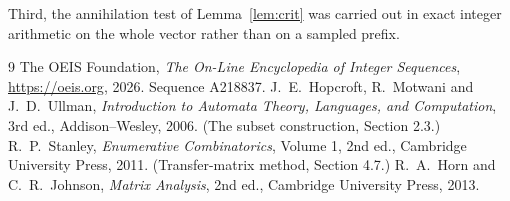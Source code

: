 \documentclass[11pt,a4paper]{article}
\theoremstyle{plain}
\theoremstyle{definition}
\begin{document}
Third, the annihilation test of Lemma~\ref{lem:crit} was carried out in exact integer
arithmetic on the whole vector rather than on a sampled prefix.

\begin{thebibliography}{9}
 The OEIS Foundation, \emph{The On-Line Encyclopedia of Integer
Sequences}, \url{https://oeis.org}, 2026. Sequence A218837.
 J.~E.~Hopcroft, R.~Motwani and J.~D.~Ullman, \emph{Introduction to Automata
Theory, Languages, and Computation}, 3rd ed., Addison--Wesley, 2006. (The subset
construction, Section 2.3.)
 R.~P.~Stanley, \emph{Enumerative Combinatorics}, Volume 1, 2nd ed.,
Cambridge University Press, 2011. (Transfer-matrix method, Section 4.7.)
 R.~A.~Horn and C.~R.~Johnson, \emph{Matrix Analysis}, 2nd ed., Cambridge
University Press, 2013.
\end{thebibliography}
\end{document}
